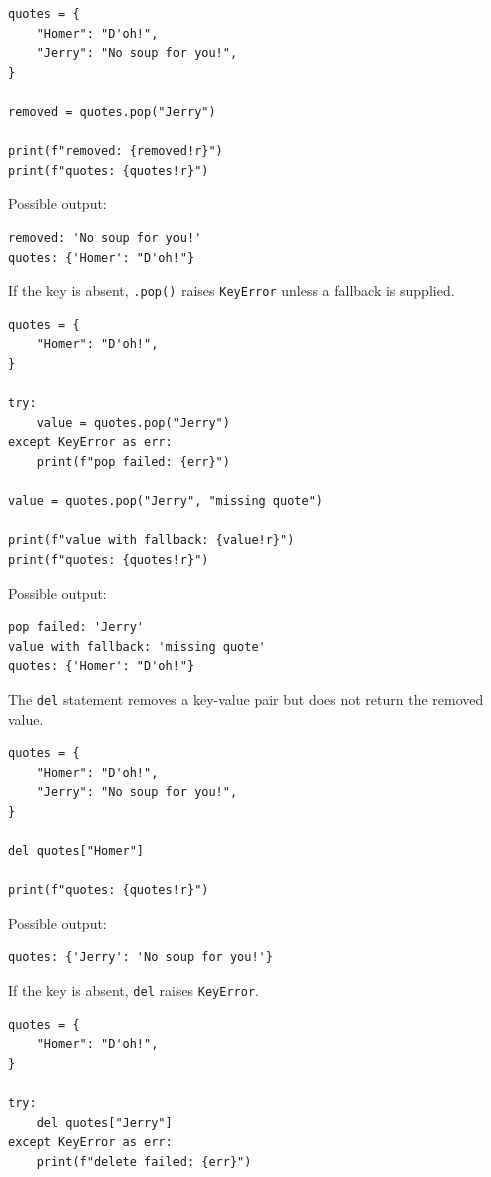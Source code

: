 \begin{verbatim}
quotes = {
    "Homer": "D'oh!",
    "Jerry": "No soup for you!",
}

removed = quotes.pop("Jerry")

print(f"removed: {removed!r}")
print(f"quotes: {quotes!r}")
\end{verbatim}

Possible output:

\begin{verbatim}
removed: 'No soup for you!'
quotes: {'Homer': "D'oh!"}
\end{verbatim}

If the key is absent, \texttt{.pop()} raises \texttt{KeyError} unless a fallback is supplied.

\begin{verbatim}
quotes = {
    "Homer": "D'oh!",
}

try:
    value = quotes.pop("Jerry")
except KeyError as err:
    print(f"pop failed: {err}")

value = quotes.pop("Jerry", "missing quote")

print(f"value with fallback: {value!r}")
print(f"quotes: {quotes!r}")
\end{verbatim}

Possible output:

\begin{verbatim}
pop failed: 'Jerry'
value with fallback: 'missing quote'
quotes: {'Homer': "D'oh!"}
\end{verbatim}

The \texttt{del} statement removes a key-value pair but does not return the removed value.

\begin{verbatim}
quotes = {
    "Homer": "D'oh!",
    "Jerry": "No soup for you!",
}

del quotes["Homer"]

print(f"quotes: {quotes!r}")
\end{verbatim}

Possible output:

\begin{verbatim}
quotes: {'Jerry': 'No soup for you!'}
\end{verbatim}

If the key is absent, \texttt{del} raises \texttt{KeyError}.

\begin{verbatim}
quotes = {
    "Homer": "D'oh!",
}

try:
    del quotes["Jerry"]
except KeyError as err:
    print(f"delete failed: {err}")
\end{verbatim}

